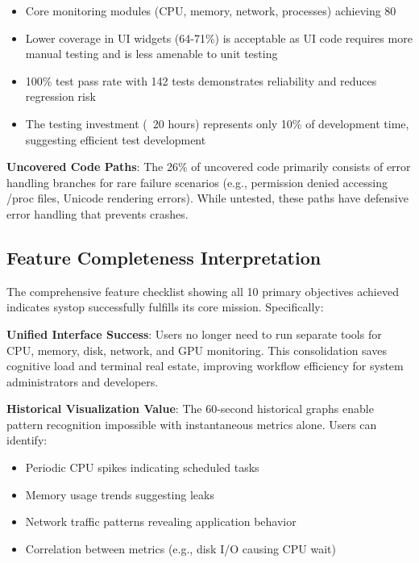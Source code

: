 \documentclass[12pt,a4paper,oneside]{report}
\begin{document}
\begin{itemize}
    \item Core monitoring modules (CPU, memory, network, processes) achieving 80%
    \item Lower coverage in UI widgets (64-71\%) is acceptable as UI code requires more manual testing and is less amenable to unit testing
    \item 100\% test pass rate with 142 tests demonstrates reliability and reduces regression risk
    \item The testing investment (~20 hours) represents only 10\% of development time, suggesting efficient test development
\end{itemize}

\textbf{Uncovered Code Paths}: The 26\% of uncovered code primarily consists of error handling branches for rare failure scenarios (e.g., permission denied accessing /proc files, Unicode rendering errors). While untested, these paths have defensive error handling that prevents crashes.

\subsection{Feature Completeness Interpretation}

The comprehensive feature checklist showing all 10 primary objectives achieved indicates systop successfully fulfills its core mission. Specifically:

\textbf{Unified Interface Success}: Users no longer need to run separate tools for CPU, memory, disk, network, and GPU monitoring. This consolidation saves cognitive load and terminal real estate, improving workflow efficiency for system administrators and developers.

\textbf{Historical Visualization Value}: The 60-second historical graphs enable pattern recognition impossible with instantaneous metrics alone. Users can identify:
\begin{itemize}
    \item Periodic CPU spikes indicating scheduled tasks
    \item Memory usage trends suggesting leaks
    \item Network traffic patterns revealing application behavior
    \item Correlation between metrics (e.g., disk I/O causing CPU wait)
\end{itemize}
\end{document}
